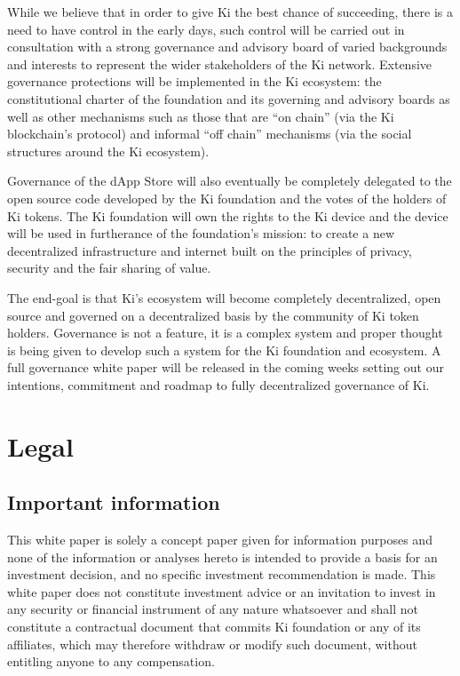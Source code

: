 While we believe that in order to give Ki the best chance of succeeding, there is a need to have control in the early days, such control will be carried out in consultation with a strong governance and advisory board of varied backgrounds and interests to represent the wider stakeholders of the Ki network. Extensive governance protections will be implemented in the Ki ecosystem: the constitutional charter of the foundation and its governing and advisory boards as well as other mechanisms such as those that are “on chain” (via the Ki blockchain's protocol) and informal “off chain” mechanisms (via the social structures around the Ki ecosystem).
					
Governance of the dApp Store will also eventually be completely delegated to the open source code developed by the Ki foundation and the votes of the holders of Ki tokens. The Ki foundation will own the rights to the Ki device and the device will be used in furtherance of the foundation's mission: to create a new decentralized infrastructure and internet built on the principles of privacy, security and the fair sharing of value.
					
The end-goal is that Ki's ecosystem will become completely decentralized, open source and governed on a decentralized basis by the community of Ki token holders. Governance is not a feature, it is a complex system and proper thought is being given to develop such a system for the Ki foundation and ecosystem. A full governance white paper will be released in the coming weeks setting out our intentions, commitment and roadmap to fully decentralized governance of Ki.


\section{Legal}
\subsection{Important information}
This white paper is solely a concept paper given for information purposes and none of the information or analyses hereto is intended to provide a basis for an investment decision, and no specific investment recommendation is made. This white paper does not constitute investment advice or an invitation to invest in any security or financial instrument of any nature whatsoever and shall not constitute a contractual document that commits Ki foundation or any of its affiliates, which may therefore withdraw or modify such document, without entitling anyone to any compensation.


